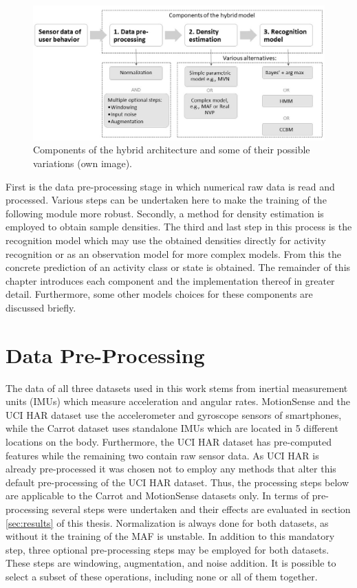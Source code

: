 \documentclass[11pt,titlepage,oneside,openany]{book}
\begin{document}
\begin{figure}[h]
	\centering
	\includegraphics[width=\linewidth]{Hybrid_V2.jpg}
	\caption[Hybrid architecture components]{Components of the hybrid architecture and some of their possible variations (own image).}
	\label{fig:schema}
\end{figure}

\noindent First is the data pre-processing stage in which numerical raw data is read and processed. Various steps can be undertaken here to make the training of the following module more robust. Secondly, a method for density estimation is employed to obtain sample densities. The third and last step in this process is the recognition model which may use the obtained densities directly for activity recognition or as an observation model for more complex models. From this the concrete prediction of an activity class or state is obtained. The remainder of this chapter introduces each component and the implementation thereof in greater detail. Furthermore, some other models choices for these components are discussed briefly.

\section{Data Pre-Processing}
\label{sec:prep}

The data of all three datasets used in this work stems from inertial measurement units (IMUs) which measure acceleration and angular rates. MotionSense \cite{malekzadeh_mobile_2019} and the UCI HAR \cite{anguita_public_2013} dataset use the accelerometer and gyroscope sensors of smartphones, while the Carrot dataset \cite{kruger_recognising_2011} uses standalone IMUs which are located in 5 different locations on the body. Furthermore, the UCI HAR dataset has pre-computed features while the remaining two contain raw sensor data. As UCI HAR is already pre-processed it was chosen not to employ any methods that alter this default pre-processing of the UCI HAR dataset. Thus, the processing steps below are applicable to the Carrot and MotionSense datasets only. In terms of pre-processing several steps were undertaken and their effects are evaluated in section \ref{sec:results} of this thesis. Normalization is always done for both datasets, as without it the training of the MAF is unstable. In addition to this mandatory step, three optional pre-processing steps may be employed for both datasets. These steps are windowing, augmentation, and noise addition. It is possible to select a subset of these operations, including none or all of them together.
\end{document}
